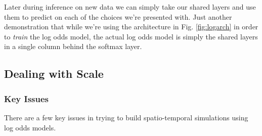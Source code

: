 \documentclass[11pt]{article}
\begin{document}
Later during inference on new data we can simply take our shared layers and use them to predict on each of the choices we're presented with. Just another demonstration that while we're using the architecture in Fig. \ref{fig:logarch} in order to \textit{train} the log odds model, the actual log odds model is simply the shared layers in a single column behind the softmax layer. 


\subsection{Dealing with Scale}

\subsubsection{Key Issues}

There are a few key issues in trying to build spatio-temporal simulations using log odds models.
\end{document}
